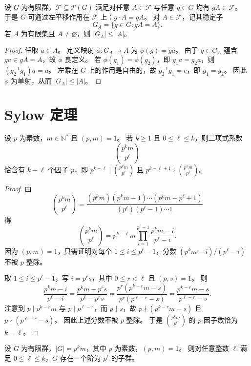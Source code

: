\documentclass[lang=cn,a4paper,newtx]{elegantbook}
\begin{document}
\begin{proposition}
  设 $G$ 为有限群，$\mathcal{F}\subseteq \mathcal{P}(G)$ 满足对任意 $A\in\mathcal{F}$ 与任意 $g\in G$ 均有 $gA\in\mathcal{F}$。
  于是 $G$ 可通过左平移作用在 $\mathcal{F}$ 上：$g\cdot A=gA$。
  对 $A\in\mathcal{F}$，记其稳定子
  \[
    G_A=\{g\in G:gA=A\}.
  \]
  若 $A$ 为有限集且 $A\ne\varnothing$，则 $|G_A|\le |A|$。
\end{proposition}

\begin{proof}
  任取 $a\in A$。
  定义映射 $\phi:G_A\to A$ 为 $\phi(g)=ga$。
  由于 $g\in G_A$ 蕴含 $ga\in gA=A$，故 $\phi$ 良定义。
  若 $\phi(g_1)=\phi(g_2)$，即 $g_1a=g_2a$，则 $(g_2^{-1}g_1)a=a$。
  左乘在 $G$ 上的作用是自由的，故 $g_2^{-1}g_1=e$，即 $g_1=g_2$。
  因此 $\phi$ 为单射，从而 $|G_A|\le |A|$。
\end{proof}

\section{Sylow 定理}

\begin{lemma}\label{binomial-p-factor}
  设 $p$ 为素数，$m\in\mathbb N^{*}$ 且 $(p,m)=1$。
  若 $k\ge 1$ 且 $0\le \ell\le k$，则二项式系数
  \[
    \binom{p^k m}{p^{\ell}}
  \]
  恰含有 $k-\ell$ 个因子 $p$，即 $p^{k-\ell}\mid \binom{p^k m}{p^{\ell}}$ 且 $p^{k-\ell+1}\nmid \binom{p^k m}{p^{\ell}}$。
\end{lemma}

\begin{proof}
  由
  \[
    \binom{p^k m}{p^{\ell}}=
    \frac{(p^k m)(p^k m-1)\cdots (p^k m-p^{\ell}+1)}{(p^{\ell})(p^{\ell}-1)\cdots 1}
  \]
  得
  \[
    \binom{p^k m}{p^{\ell}}=p^{k-\ell}m\prod_{i=1}^{p^{\ell}-1}\frac{p^k m-i}{p^{\ell}-i}.
  \]
  因为 $(p,m)=1$，只需证明对每个 $1\le i\le p^{\ell}-1$，分数 $(p^k m-i)/(p^{\ell}-i)$ 不被 $p$ 整除。

  取 $1\le i\le p^{\ell}-1$，写 $i=p^r s$，其中 $0\le r<\ell$ 且 $(p,s)=1$。
  则
  \[
    \frac{p^k m-i}{p^{\ell}-i}=\frac{p^k m-p^r s}{p^{\ell}-p^r s}=\frac{p^r(p^{k-r}m-s)}{p^r(p^{\ell-r}-s)}=\frac{p^{k-r}m-s}{p^{\ell-r}-s}.
  \]
  注意到 $p\mid p^{k-r}m$ 与 $p\mid p^{\ell-r}$，而 $p\nmid s$，故 $p\nmid (p^{k-r}m-s)$ 且 $p\nmid (p^{\ell-r}-s)$。
  因此上述分数不被 $p$ 整除。
  于是 $\binom{p^k m}{p^{\ell}}$ 的 $p$-因子数恰为 $k-\ell$。
\end{proof}

\begin{theorem}[Sylow 定理(I)]
  设 $G$ 为有限群，$|G|=p^k m$，其中 $p$ 为素数，$(p,m)=1$。
  则对任意整数 $\ell$ 满足 $0\le \ell\le k$，$G$ 存在一个阶为 $p^{\ell}$ 的子群。
\end{theorem}
\end{document}
